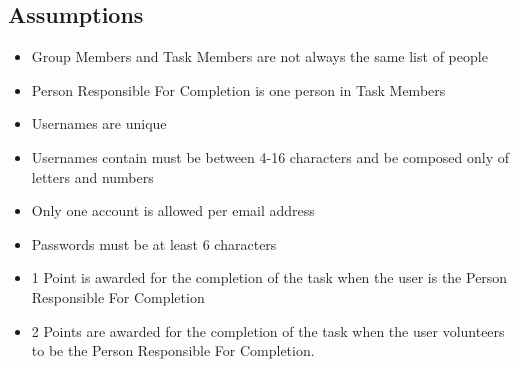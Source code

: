 \documentclass[a4paper]{article}
\begin{document}
\subsection{Assumptions}
\begin{itemize}
\item Group Members and Task Members are not always the same list of people
\item Person Responsible For Completion is one person in Task Members
\item Usernames are unique
\item Usernames contain must be between 4-16 characters and be composed only of letters and numbers
\item Only one account is allowed per email address
\item Passwords must be at least 6 characters
\item 1 Point is awarded for the completion of the task when the user is the Person Responsible For Completion
\item 2 Points are awarded for the completion of the task when the user volunteers to be the Person Responsible For Completion.
\end{itemize}
\end{document}
